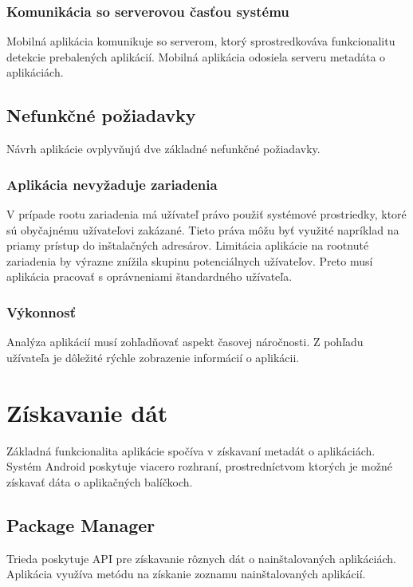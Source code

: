 \subsubsection{\textbf{Komunikácia so serverovou časťou systému}}
Mobilná aplikácia komunikuje so serverom, ktorý sprostredkováva funkcionalitu detekcie prebalených aplikácií. Mobilná aplikácia odosiela serveru metadáta o aplikáciách.

\subsection{Nefunkčné požiadavky}
Návrh aplikácie ovplyvňujú dve základné nefunkčné požiadavky.

\subsubsection{\textbf{Aplikácia nevyžaduje  zariadenia}}
V prípade rootu zariadenia má užívateľ právo použiť systémové prostriedky, ktoré sú obyčajnému užívateľovi zakázané. Tieto práva môžu byť využité napríklad na priamy prístup do inštalačných adresárov. Limitácia aplikácie na rootnuté zariadenia by výrazne znížila skupinu potenciálnych užívateľov. Preto musí aplikácia pracovať s oprávneniami štandardného užívateľa.

\subsubsection{\textbf{Výkonnosť}}
Analýza aplikácií musí zohľadňovať aspekt časovej náročnosti. Z pohľadu užívateľa je dôležité rýchle zobrazenie informácií o aplikácii. 


\section{Získavanie dát}
Základná funkcionalita aplikácie spočíva v získavaní metadát o aplikáciách. Systém Android poskytuje viacero rozhraní, prostredníctvom ktorých je možné získavať dáta o aplikačných balíčkoch.

\subsection{Package Manager}
Trieda  poskytuje API pre získavanie rôznych dát o nainštalovaných aplikáciách. Aplikácia  využíva metódu  na získanie zoznamu nainštalovaných aplikácií. 

